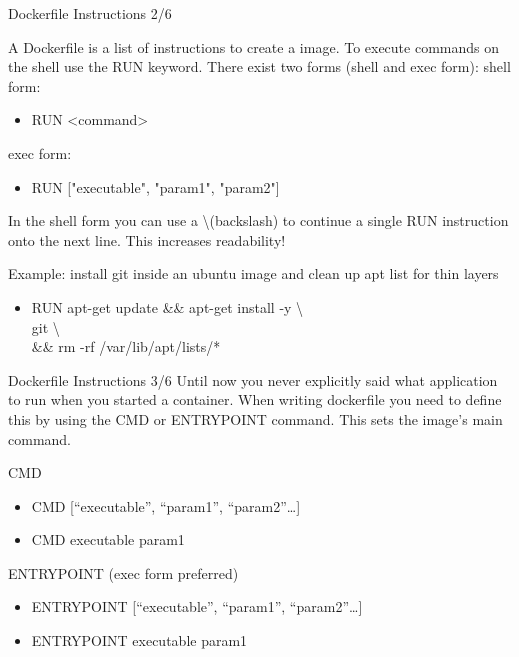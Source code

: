 \documentclass[10pt,aspectratio=\ratio,
compress
]{beamer}
\begin{document}
\begin{frame}{Dockerfile Instructions 2/6}

A Dockerfile is a list of instructions to create a image.
To execute commands on the shell use the RUN keyword.
There exist two forms (shell and exec form):
shell form:
\begin{itemize}
	\item RUN <command>
\end{itemize}
exec form:
\begin{itemize}
	\item RUN ["executable", "param1", "param2"]
\end{itemize}

In the shell form you can use a \textbackslash  (backslash) to continue a single RUN instruction onto the next line. This increases readability!


Example: install git inside an ubuntu image and clean up apt list for thin layers
\begin{itemize}
	\item RUN apt-get update \&\& apt-get install -y \textbackslash \\
	git \textbackslash \\
	\&\& rm -rf /var/lib/apt/lists/*
\end{itemize}
\end{frame}


\begin{frame}{Dockerfile Instructions 3/6}
Until now you never explicitly said what application to run when you started a container.
When writing dockerfile you need to define this by using the CMD or ENTRYPOINT command. This sets the image’s main command.

CMD
\begin{itemize}
	\item CMD [“executable”, “param1”, “param2”…]
	\item CMD executable param1
\end{itemize}


ENTRYPOINT (exec form preferred)
\begin{itemize}
	\item ENTRYPOINT [“executable”, “param1”, “param2”…]
	\item ENTRYPOINT executable param1
\end{itemize}
\end{frame}
\end{document}
